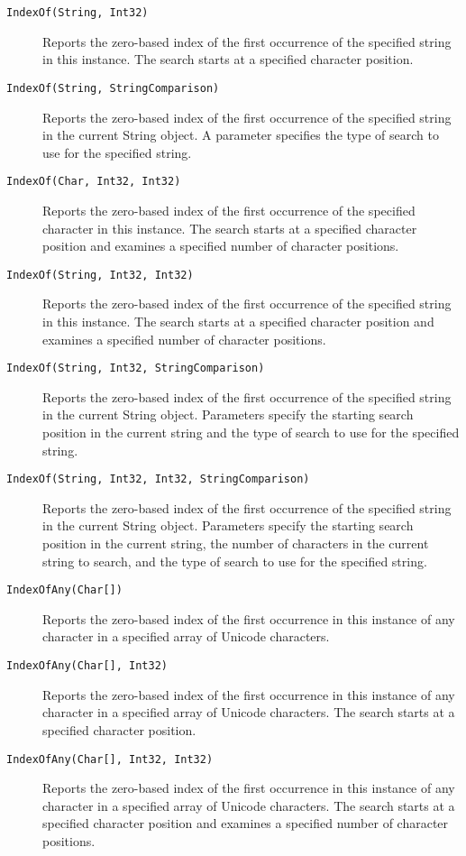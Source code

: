 \begin{description}
\item[\texttt{IndexOf(String, Int32)}] Reports the zero-based index of the first occurrence of the specified string in this instance. The search starts at a specified character position.
\item[\texttt{IndexOf(String, StringComparison)}] Reports the zero-based index of the first occurrence of the specified string in the current String object. A parameter specifies the type of search to use for the specified string.
\item[\texttt{IndexOf(Char, Int32, Int32)}] Reports the zero-based index of the first occurrence of the specified character in this instance. The search starts at a specified character position and examines a specified number of character positions.
\item[\texttt{IndexOf(String, Int32, Int32)}] Reports the zero-based index of the first occurrence of the specified string in this instance. The search starts at a specified character position and examines a specified number of character positions.
\item[\texttt{IndexOf(String, Int32, StringComparison)}] Reports the zero-based index of the first occurrence of the specified string in the current String object. Parameters specify the starting search position in the current string and the type of search to use for the specified string.
\item[\texttt{IndexOf(String, Int32, Int32, StringComparison)}] Reports the zero-based index of the first occurrence of the specified string in the current String object. Parameters specify the starting search position in the current string, the number of characters in the current string to search, and the type of search to use for the specified string.
\item[\texttt{IndexOfAny(Char[])}] Reports the zero-based index of the first occurrence in this instance of any character in a specified array of Unicode characters.
\item[\texttt{IndexOfAny(Char[], Int32)}] Reports the zero-based index of the first occurrence in this instance of any character in a specified array of Unicode characters. The search starts at a specified character position.
\item[\texttt{IndexOfAny(Char[], Int32, Int32)}] Reports the zero-based index of the first occurrence in this instance of any character in a specified array of Unicode characters. The search starts at a specified character position and examines a specified number of character positions.

\end{description}

